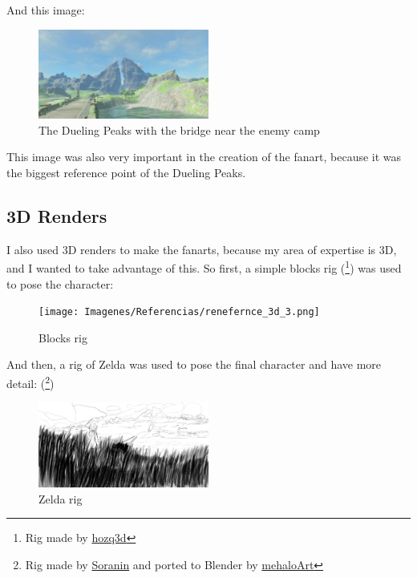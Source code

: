 \documentclass{cup-pan}
\begin{document}
    And this image: 
    \begin{figure}[H]
        \includegraphics[width=0.5\textwidth]{Imagenes/Referencias/Dueling_Peaks.png}
        \caption{The Dueling Peaks with the bridge near the enemy camp}
    \end{figure}
    This image was also very important in the creation of the fanart, because it was the biggest reference point of the Dueling Peaks.\\

    \subsection*{3D Renders}
    I also used 3D renders to make the fanarts, because my area of expertise is 3D, and I wanted to take advantage of this.
    So first, a simple blocks rig
    (\footnote{Rig made by 
    \href{https://hozq3d.gumroad.com/l/Blocks}{hozq3d}}) 
    was used to pose the character: 
    \begin{figure}[H]
        \texttt{[image: Imagenes/Referencias/renefernce\_3d\_3.png]}
        \caption{Blocks rig}
    \end{figure}

    And then, a rig of Zelda was used to pose the final character and have more detail:    
    (\footnote{Rig made by 
    \href{https://www.youtube.com/watch?v=1EUcGBMVRbA}{Soranin} and ported to Blender by  
    \href{https://twitter.com/mehaloArt/status/1528197222751383552?s=20}{mehaloArt}})

    \begin{figure}[H]
        \includegraphics[width=0.5\textwidth]{Imagenes/Referencias/ref_zelda.png}
        \caption{Zelda rig}
    \end{figure}
\end{document}

